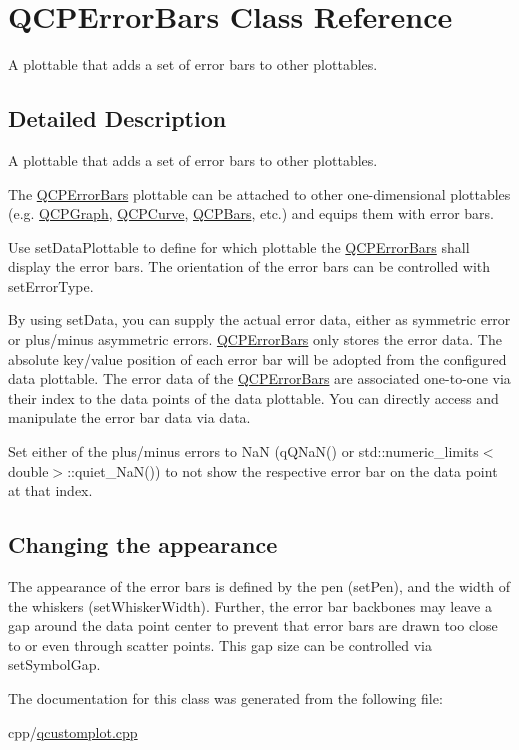 \hypertarget{class_q_c_p_error_bars}{}\section{Q\+C\+P\+Error\+Bars Class Reference}
\label{class_q_c_p_error_bars}


A plottable that adds a set of error bars to other plottables.  




\subsection{Detailed Description}
A plottable that adds a set of error bars to other plottables. 



The \mbox{\hyperlink{class_q_c_p_error_bars}{Q\+C\+P\+Error\+Bars}} plottable can be attached to other one-\/dimensional plottables (e.\+g. \mbox{\hyperlink{class_q_c_p_graph}{Q\+C\+P\+Graph}}, \mbox{\hyperlink{class_q_c_p_curve}{Q\+C\+P\+Curve}}, \mbox{\hyperlink{class_q_c_p_bars}{Q\+C\+P\+Bars}}, etc.) and equips them with error bars.

Use set\+Data\+Plottable to define for which plottable the \mbox{\hyperlink{class_q_c_p_error_bars}{Q\+C\+P\+Error\+Bars}} shall display the error bars. The orientation of the error bars can be controlled with set\+Error\+Type.

By using set\+Data, you can supply the actual error data, either as symmetric error or plus/minus asymmetric errors. \mbox{\hyperlink{class_q_c_p_error_bars}{Q\+C\+P\+Error\+Bars}} only stores the error data. The absolute key/value position of each error bar will be adopted from the configured data plottable. The error data of the \mbox{\hyperlink{class_q_c_p_error_bars}{Q\+C\+P\+Error\+Bars}} are associated one-\/to-\/one via their index to the data points of the data plottable. You can directly access and manipulate the error bar data via data.

Set either of the plus/minus errors to NaN ({\ttfamily q\+Q\+Na\+N()} or {\ttfamily std\+::numeric\+\_\+limits$<$double$>$\+::quiet\+\_\+\+Na\+N()}) to not show the respective error bar on the data point at that index.\hypertarget{class_q_c_p_error_bars_qcperrorbars-appearance}{}\subsection{Changing the appearance}\label{class_q_c_p_error_bars_qcperrorbars-appearance}
The appearance of the error bars is defined by the pen (set\+Pen), and the width of the whiskers (set\+Whisker\+Width). Further, the error bar backbones may leave a gap around the data point center to prevent that error bars are drawn too close to or even through scatter points. This gap size can be controlled via set\+Symbol\+Gap. 

The documentation for this class was generated from the following file\+:\begin{DoxyCompactItemize}
\item 
cpp/\mbox{\hyperlink{qcustomplot_8cpp}{qcustomplot.\+cpp}}\end{DoxyCompactItemize}
